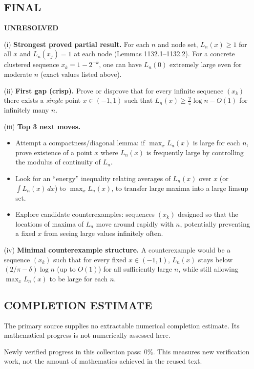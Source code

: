 \subsection*{FINAL}
\textbf{UNRESOLVED}

(i) \textbf{Strongest proved partial result.}
For each $n$ and node set, $L_n(x)\ge 1$ for all $x$ and $L_n(x_j)=1$ at each node (Lemmas 1132.1--1132.2). For a concrete clustered sequence $x_k=1-2^{-k}$, one can have $L_n(0)$ extremely large even for moderate $n$ (exact values listed above).

(ii) \textbf{First gap (crisp).}
Prove or disprove that for every infinite sequence $(x_k)$ there exists a \emph{single} point $x\in(-1,1)$ such that $L_n(x)\ge \tfrac{2}{\pi}\log n - O(1)$ for infinitely many $n$.

(iii) \textbf{Top 3 next moves.}
\begin{itemize}
\item Attempt a compactness/diagonal lemma: if $\max_{x}L_n(x)$ is large for each $n$, prove existence of a point $x$ where $L_n(x)$ is frequently large by controlling the modulus of continuity of $L_n$.
\item Look for an ``energy'' inequality relating averages of $L_n(x)$ over $x$ (or $\int L_n(x)\,dx$) to $\max_x L_n(x)$, to transfer large maxima into a large limsup set.
\item Explore candidate counterexamples: sequences $(x_k)$ designed so that the locations of maxima of $L_n$ move around rapidly with $n$, potentially preventing a fixed $x$ from seeing large values infinitely often.
\end{itemize}

(iv) \textbf{Minimal counterexample structure.}
A counterexample would be a sequence $(x_k)$ such that for every fixed $x\in(-1,1)$, $L_n(x)$ stays below $(2/\pi-\delta)\log n$ (up to $O(1)$) for all sufficiently large $n$, while still allowing $\max_x L_n(x)$ to be large for each $n$.




\subsection*{COMPLETION ESTIMATE}
The primary source supplies no extractable numerical completion estimate. Its mathematical progress is not numerically assessed here.

Newly verified progress in this collection pass: $0\%$. This measures new verification work, not the amount of mathematics achieved in the reused text.
